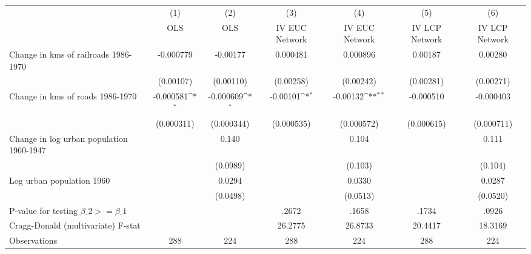 {
\def\sym#1{\ifmmode^{#1}\else\(^{#1}\)\fi}
\begin{tabular}{l*{6}{c}}
\hline\hline
                &\multicolumn{1}{c}{(1)}&\multicolumn{1}{c}{(2)}&\multicolumn{1}{c}{(3)}&\multicolumn{1}{c}{(4)}&\multicolumn{1}{c}{(5)}&\multicolumn{1}{c}{(6)}\\
                &\multicolumn{1}{c}{OLS}&\multicolumn{1}{c}{OLS}&\multicolumn{1}{c}{IV EUC Network}&\multicolumn{1}{c}{IV EUC Network}&\multicolumn{1}{c}{IV LCP Network}&\multicolumn{1}{c}{IV LCP Network}\\
\hline
Change in kms of railroads 1986-1970&-0.000779         & -0.00177         & 0.000481         & 0.000896         &  0.00187         &  0.00280         \\
                &(0.00107)         &(0.00110)         &(0.00258)         &(0.00242)         &(0.00281)         &(0.00271)         \\
[1em]
Change in kms of roads 1986-1970&-0.000581\sym{*}  &-0.000609\sym{*}  & -0.00101\sym{*}  & -0.00132\sym{**} &-0.000510         &-0.000403         \\
                &(0.000311)         &(0.000344)         &(0.000535)         &(0.000572)         &(0.000615)         &(0.000711)         \\
[1em]
Change in log urban population 1960-1947&                  &    0.140         &                  &    0.104         &                  &    0.111         \\
                &                  & (0.0989)         &                  &  (0.103)         &                  &  (0.104)         \\
[1em]
Log urban population 1960&                  &   0.0294         &                  &   0.0330         &                  &   0.0287         \\
                &                  & (0.0498)         &                  & (0.0513)         &                  & (0.0520)         \\
\hline
P-value for testing $\beta\_{2} >= \beta\_{1}$&                  &                  &    .2672         &    .1658         &    .1734         &    .0926         \\
Cragg-Donald (multivariate) F-stat&                  &                  &  26.2775         &  26.8733         &  20.4417         &  18.3169         \\
Observations    &      288         &      224         &      288         &      224         &      288         &      224         \\
\hline\hline
\end{tabular}
}
